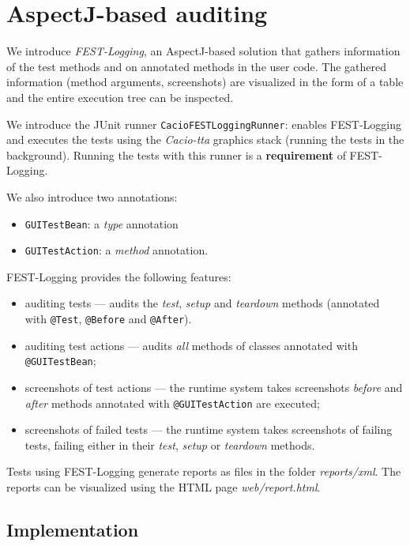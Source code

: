 \section{AspectJ-based auditing}

We introduce \emph{FEST-Logging}, an AspectJ-based solution that gathers information of the test methods and on annotated methods in the user code. The gathered information (method arguments, screenshots) are visualized in the form of a table and the entire execution tree can be inspected.

We introduce the JUnit runner \texttt{CacioFESTLoggingRunner}: enables FEST-Logging and executes the tests using the \emph{Cacio-tta} graphics stack (running the tests in the background). Running the tests with this runner is a \textbf{requirement} of FEST-Logging.

We also introduce two annotations:
\begin{itemize}
\item \texttt{GUITestBean}: a \emph{type} annotation
\item \texttt{GUITestAction}: a \emph{method} annotation.
\end{itemize}

FEST-Logging provides the following features:
\begin{itemize}
\item auditing tests --- audits the \emph{test}, \emph{setup} and \emph{teardown} methods (annotated with \texttt{@Test}, \texttt{@Before} and \texttt{@After}).
\item auditing test actions --- audits \emph{all} methods of classes annotated with \texttt{@GUITestBean};
\item screenshots of test actions --- the runtime system takes screenshots \emph{before} and \emph{after} methods annotated with \texttt{@GUITestAction} are executed;
\item screenshots of failed tests --- the runtime system takes screenshots of failing tests, failing either in their \emph{test}, \emph{setup} or \emph{teardown} methods. 
\end{itemize}

Tests using FEST-Logging generate reports as files in the folder \emph{reports/xml}. The reports can be visualized using the HTML page \emph{web/report.html}.

\subsection{Implementation}


